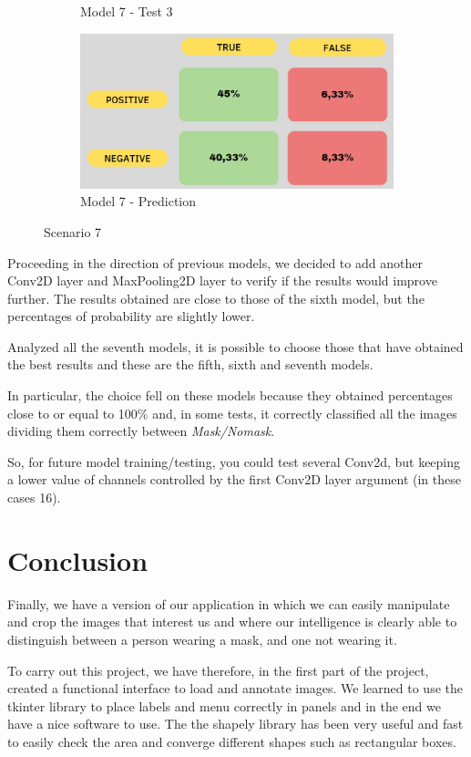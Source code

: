 \documentclass[a4paper,12pt]{article}
\begin{document}
\begin{figure}
\begin{subfigure}{6cm}
        \caption{ Model 7 - Test 3}
    \end{subfigure}
     \begin{subfigure}{6cm}
        \includegraphics[width=\linewidth]{images_latex/model7.jpg}
        \caption{ Model 7 - Prediction}
    \end{subfigure}
    \caption{Scenario 7}%
\end{figure}

Proceeding in the direction of previous models, we decided to add another Conv2D layer and MaxPooling2D layer to verify if the results would improve further.
The results obtained are close to those of the sixth model, but the percentages of probability are slightly lower.

Analyzed all the seventh models, it is possible to choose those that have obtained the best results and these are the fifth, sixth and seventh models. 

In particular, the choice fell on these models because they obtained percentages close to or equal to 100\% and, in some tests, it correctly classified all the images dividing them correctly between \textit{Mask/Nomask}.

So, for future model training/testing, you could test several Conv2d, but keeping a lower value of channels controlled by the first Conv2D layer argument (in these cases 16).
\newpage
\section{Conclusion}

Finally, we have a version of our application in which we can easily manipulate and crop the images that interest us and where our intelligence is clearly able to distinguish between a person wearing a mask, and one not wearing it.

To carry out this project, we have therefore, in the first part of the project, created a functional interface to load and annotate images. We learned to use the tkinter library to place labels and menu correctly in panels and in the end we have a nice software to use. The the shapely library has been very useful and fast to easily check the area and converge different shapes such as rectangular boxes.
\end{document}
